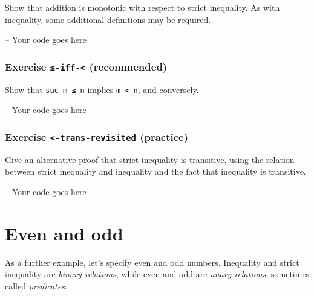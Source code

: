 Show that addition is monotonic with respect to strict inequality. As
with inequality, some additional definitions may be required.

\begin{fence}
\begin{code}
-- Your code goes here
\end{code}
\end{fence}

\hypertarget{Relations-leq-iff-less}{%
\subsubsection{\texorpdfstring{Exercise \texttt{≤-iff-\textless{}}
(recommended)}{Exercise ≤-iff-\textless{} (recommended)}}\label{Relations-leq-iff-less}}

Show that \texttt{suc\ m\ ≤\ n} implies \texttt{m\ \textless{}\ n}, and
conversely.

\begin{fence}
\begin{code}
-- Your code goes here
\end{code}
\end{fence}

\hypertarget{Relations-less-trans-revisited}{%
\subsubsection{\texorpdfstring{Exercise
\texttt{\textless{}-trans-revisited}
(practice)}{Exercise \textless-trans-revisited (practice)}}\label{Relations-less-trans-revisited}}

Give an alternative proof that strict inequality is transitive, using
the relation between strict inequality and inequality and the fact that
inequality is transitive.

\begin{fence}
\begin{code}
-- Your code goes here
\end{code}
\end{fence}

\hypertarget{even-and-odd}{%
\section{Even and odd}\label{even-and-odd}}

As a further example, let's specify even and odd numbers. Inequality and
strict inequality are \emph{binary relations}, while even and odd are
\emph{unary relations}, sometimes called \emph{predicates}:

